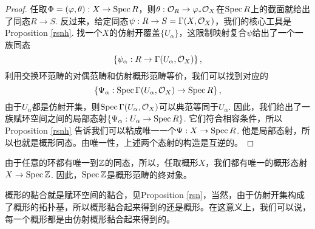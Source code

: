 \begin{proof}
	任取$\Phi=(\varphi,\theta):X\to \operatorname{Spec} R$，则$\theta:\mathcal{O}_R\to \varphi_*\mathcal{O}_X$在$\operatorname{Spec} R$上的截面就给出了同态$R\to S$. 反过来，给定同态$\psi:R\to S=\Gamma(X,\mathcal{O}_X)$，我们的核心工具是Proposition \ref{rsnh}. 找一个$X$的仿射开覆盖$\{U_\alpha\}$，这限制映射复合$\psi$给出了一个一族同态
	\[
	\left\{\psi_\alpha:R\to \Gamma(U_\alpha,\mathcal{O}_X)\right\},
	\]
	利用交换环范畴的对偶范畴和仿射概形范畴等价，我们可以找到对应的
	\[
	\left\{\Psi_\alpha:\operatorname{Spec}\Gamma(U_\alpha,\mathcal{O}_X)\to \operatorname{Spec} R\right\},
	\]
	由于$U_\alpha$都是仿射开集，则$\operatorname{Spec}\Gamma(U_\alpha,\mathcal{O}_X)$可以典范等同于$U_\alpha$. 因此，我们给出了一族赋环空间之间的局部态射$\left\{\Psi_\alpha: U_\alpha \to \operatorname{Spec} R\right\}$. 它们符合相容条件，所以Proposition \ref{rsnh} 告诉我们可以粘成唯一一个$\Psi:X\to \operatorname{Spec} R$. 他是局部态射，所以也就是概形同态。由唯一性，上述两个态射的构造是互逆的。
\end{proof}

由于任意的环都有唯一到$\mathbb{Z}$的同态，所以，任取概形$X$，我们都有唯一的概形态射$X\to \operatorname{Spec} \mathbb{Z}$. 因此，$\operatorname{Spec} \mathbb{Z}$是概形范畴的终对象。

\begin{para}[概形的黏合]
概形的黏合就是赋环空间的黏合，见Proposition \ref{rsn}，当然，由于仿射开集构成了概形的拓扑基，所以概形黏合起来得到的还是概形。在这意义上，我们可以说，每一个概形都是由仿射概形黏合起来得到的。
\end{para}

